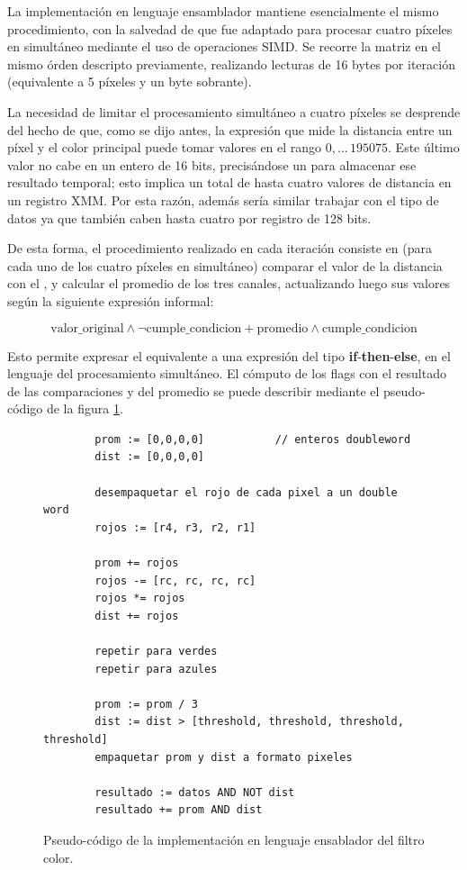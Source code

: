 La implementación en lenguaje ensamblador mantiene esencialmente el mismo procedimiento, con la salvedad de que fue adaptado para procesar cuatro píxeles en simultáneo mediante el uso de operaciones SIMD. Se recorre la matriz en el mismo órden descripto previamente, realizando lecturas de 16 bytes por iteración (equivalente a 5 píxeles y un byte sobrante).

La necesidad de limitar el procesamiento simultáneo a cuatro píxeles se desprende del hecho de que, como se dijo antes, la expresión que mide la distancia entre un píxel y el color principal puede tomar valores en el rango $0, ... \,195075$. Este último valor no cabe en un entero de 16 bits, precisándose un  para almacenar ese resultado temporal; esto implica un total de hasta cuatro valores de distancia en un registro XMM. Por esta razón, además sería similar trabajar con el tipo de datos  ya que también caben hasta cuatro por registro de 128 bits.

De esta forma, el procedimiento realizado en cada iteración consiste en (para cada uno de los cuatro píxeles en simultáneo) comparar el valor de la distancia con el , y calcular el promedio de los tres canales, actualizando luego sus valores según la siguiente expresión informal:

$$\text{valor\_original} \land \lnot \text{cumple\_condicion} + \text{promedio} \land \text{cumple\_condicion}$$

Esto permite expresar el equivalente a una expresión del tipo \textbf{if}-\textbf{then}-\textbf{else}, en el lenguaje del procesamiento simultáneo. El cómputo de los flags con el resultado de las comparaciones y del promedio se puede describir mediante el pseudo-código de la figura \ref{fig:pseudocodigo-filtro-color}.

\begin{figure}[h]
	\begin{mdframed}
	\begin{center}
		\begin{lstlisting}
		prom := [0,0,0,0] 			// enteros doubleword
		dist := [0,0,0,0]
	
		desempaquetar el rojo de cada pixel a un double word
		rojos := [r4, r3, r2, r1]
	
		prom += rojos
		rojos -= [rc, rc, rc, rc]
		rojos *= rojos
		dist += rojos
	
		repetir para verdes
		repetir para azules
	
		prom := prom / 3
		dist := dist > [threshold, threshold, threshold, threshold]
		empaquetar prom y dist a formato pixeles

		resultado := datos AND NOT dist
		resultado += prom AND dist
		\end{lstlisting}
	\end{center}
	\end{mdframed}
	\caption{Pseudo-código de la implementación en lenguaje ensablador del filtro color.}
	\label{fig:pseudocodigo-filtro-color}
\end{figure}

